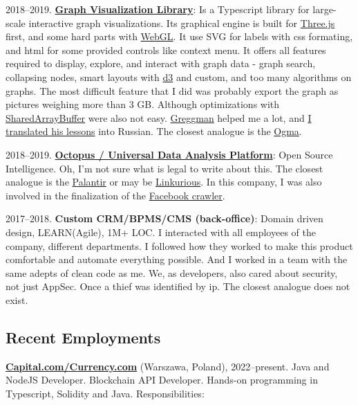 \documentclass{yb}
\begin{document}
2018--2019. \href{https://baltinfocom.ru/BigData\#en}{\textbf{Graph Visualization Library}}: Is a Typescript library for large-scale interactive graph visualizations. Its graphical engine is built for \href{https://threejs.org/}{Three.js} first, and some hard parts with \href{https://webglfundamentals.org/}{WebGL}. It use SVG for labels with css formating, and html for some provided controls like context menu. It offers all features required to display, explore, and interact with graph data - graph search, collapsing nodes, smart layouts with \href{https://github.com/d3/d3-force}{d3} and custom, and too many algorithms on graphs. The most difficult feature that I did was probably export the graph as pictures weighing more than 3 GB. Although optimizations with \href{https://developer.mozilla.org/ru/docs/Web/JavaScript/Reference/Global_Objects/SharedArrayBuffer}{SharedArrayBuffer} were also not easy. \href{https://github.com/greggman}{Greggman} helped me a lot, and \href{https://webglfundamentals.org/}{I translated his lessons} into Russian. The closest analogue is the \href{https://doc.linkurio.us/ogma/latest/}{Ogma}.

2018--2019. \href{https://baltinfocom.ru/BigData\#en}{\textbf{Octopus / Universal Data Analysis Platform}}: Open Source Intelligence. Oh, I'm not sure what is legal to write about this.
The closest analogue is the \href{https://www.palantir.com/}{Palantir} or may be  \href{https://linkurio.us/}{Linkurious}.
In this company, I was also involved in the finalization of the \href{https://github.com/NikitaIT/facebook-crawling-nightmare}{Facebook crawler}.

2017--2018. \textbf{Custom CRM/BPMS/CMS (back-office)}: 
Domain driven design, LEARN(Agile), 1M+ LOC. I interacted with all employees of the company, different departments. I followed how they worked to make this product comfortable and automate everything possible. And I worked in a team with the same adepts of clean code as me. We, as developers, also cared about security, not just AppSec. Once a thief was identified by ip. The closest analogue does not exist. 

\subsection*{Recent Employments}

\href{https://currency.com/}{\textbf{Capital.com/Currency.com}} (Warszawa, Poland), 2022--present.
Java and NodeJS Developer. Blockchain API Developer.
Hands-on programming in Typescript, Solidity and Java.
Responsibilities:
\end{document}
